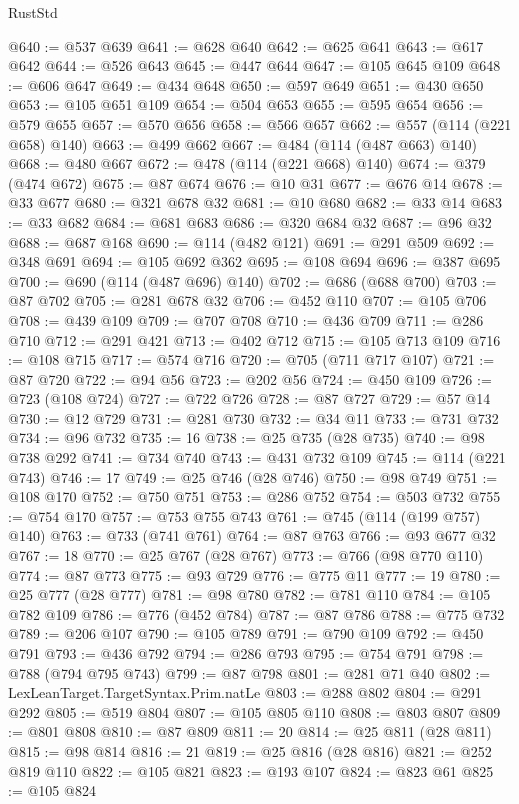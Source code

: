 \begin{lexlean}{RustStd}
\begin{coremodule}
{\begin{coremodule}
{{{{{{{{{{{{{{{{{{{{{{{{{{{{{{{{{{@640 := @537 @639
@641 := @628 @640
@642 := @625 @641
@643 := @617 @642
@644 := @526 @643
@645 := @447 @644
@647 := @105 @645 @109
@648 := @606 @647
@649 := @434 @648
@650 := @597 @649
@651 := @430 @650
@653 := @105 @651 @109
@654 := @504 @653
@655 := @595 @654
@656 := @579 @655
@657 := @570 @656
@658 := @566 @657
@662 := @557 (@114 (@221 @658) @140)
@663 := @499 @662
@667 := @484 (@114 (@487 @663) @140)
@668 := @480 @667
@672 := @478 (@114 (@221 @668) @140)
@674 := @379 (@474 @672)
@675 := @87 @674
@676 := @10 @31
@677 := @676 @14
@678 := @33 @677
@680 := @321 @678 @32
@681 := @10 @680
@682 := @33 @14
@683 := @33 @682
@684 := @681 @683
@686 := @320 @684 @32
@687 := @96 @32
@688 := @687 @168
@690 := @114 (@482 @121)
@691 := @291 @509
@692 := @348 @691
@694 := @105 @692 @362
@695 := @108 @694
@696 := @387 @695
@700 := @690 (@114 (@487 @696) @140)
@702 := @686 (@688 @700)
@703 := @87 @702
@705 := @281 @678 @32
@706 := @452 @110
@707 := @105 @706
@708 := @439 @109
@709 := @707 @708
@710 := @436 @709
@711 := @286 @710
@712 := @291 @421
@713 := @402 @712
@715 := @105 @713 @109
@716 := @108 @715
@717 := @574 @716
@720 := @705 (@711 @717 @107)
@721 := @87 @720
@722 := @94 @56
@723 := @202 @56
@724 := @450 @109
@726 := @723 (@108 @724)
@727 := @722 @726
@728 := @87 @727
@729 := @57 @14
@730 := @12 @729
@731 := @281 @730
@732 := @34 @11
@733 := @731 @732
@734 := @96 @732
@735 := 16
@738 := @25 @735 (@28 @735)
@740 := @98 @738 @292
@741 := @734 @740
@743 := @431 @732 @109
@745 := @114 (@221 @743)
@746 := 17
@749 := @25 @746 (@28 @746)
@750 := @98 @749
@751 := @108 @170
@752 := @750 @751
@753 := @286 @752
@754 := @503 @732
@755 := @754 @170
@757 := @753 @755 @743
@761 := @745 (@114 (@199 @757) @140)
@763 := @733 (@741 @761)
@764 := @87 @763
@766 := @93 @677 @32
@767 := 18
@770 := @25 @767 (@28 @767)
@773 := @766 (@98 @770 @110)
@774 := @87 @773
@775 := @93 @729
@776 := @775 @11
@777 := 19
@780 := @25 @777 (@28 @777)
@781 := @98 @780
@782 := @781 @110
@784 := @105 @782 @109
@786 := @776 (@452 @784)
@787 := @87 @786
@788 := @775 @732
@789 := @206 @107
@790 := @105 @789
@791 := @790 @109
@792 := @450 @791
@793 := @436 @792
@794 := @286 @793
@795 := @754 @791
@798 := @788 (@794 @795 @743)
@799 := @87 @798
@801 := @281 @71 @40
@802 := LexLeanTarget.TargetSyntax.Prim.natLe
@803 := @288 @802
@804 := @291 @292
@805 := @519 @804
@807 := @105 @805 @110
@808 := @803 @807
@809 := @801 @808
@810 := @87 @809
@811 := 20
@814 := @25 @811 (@28 @811)
@815 := @98 @814
@816 := 21
@819 := @25 @816 (@28 @816)
@821 := @252 @819 @110
@822 := @105 @821
@823 := @193 @107
@824 := @823 @61
@825 := @105 @824
}}}}}}}}}}}}}}}}}}}}}}}}}}}}}}}}}}
\end{coremodule}}
\end{coremodule}
\end{lexlean}
